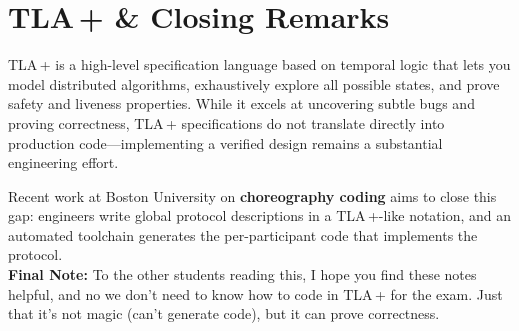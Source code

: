 \newpage
\section{TLA\,+ \& Closing Remarks}
\label{sec:tla}

\noindent
TLA\,+ is a high-level specification language based on temporal logic that lets you model distributed algorithms, exhaustively explore all possible states, 
and prove safety and liveness properties.  While it excels at uncovering subtle bugs and proving correctness, TLA\,+ specifications do not translate directly 
into production code---implementing a verified design remains a substantial engineering effort. 

\medskip
Recent work at Boston University on \textbf{choreography coding} aims to close this gap: engineers write global protocol descriptions in a TLA\,+-like notation, and an automated toolchain generates the per-participant code that implements the protocol.\\

\vfill
\noindent
\textbf{Final Note:} To the other students reading this, I hope you find these notes helpful, and no we don't need to know how to code in TLA\,+ for the exam. Just that it's not magic (can't generate code), but it can prove correctness.
\vfill